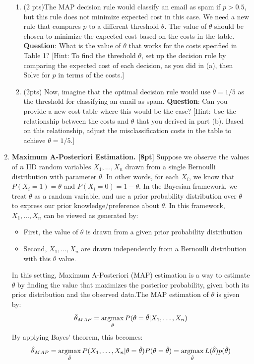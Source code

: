 \documentclass{article}
\def\argmax{\mathop{\rm argmax}}
\begin{document}
\begin{enumerate}
\begin{enumerate}
\item (2 pts)The MAP decision rule would classify an email as spam if $p>0.5$, but this rule does not minimize expected cost in this case. We need a new rule that compares $p$ to a different threshold $\theta$. The value of $\theta$ should be chosen to minimize the expected cost based on the costs in the table.\\
\textbf{Question}: What is the value of $\theta$ that works for the costs specified in Table 1? [Hint: To find the threshold $\theta$, set up the decision rule by comparing the expected cost of each decision, as you did in (a), then Solve for $p$ in terms of the costs.]\\

\item (2pts) Now, imagine that the optimal decision rule would use $\theta=1/5$ as the threshold for classifying an email as spam. \textbf{Question}: Can you provide a new cost table where this would be the case? [Hint: Use the relationship between the costs and $\theta$ that you derived in part (b). Based on this relationship, adjust the misclassification costs in the table to achieve $\theta = 1/5$.]

\end{enumerate}

\item \textbf{Maximum A-Posteriori Estimation. [8pt]}
Suppose we observe the values of $n$ IID random variables $X_1, \dots , X_n$ drawn from a single Bernoulli
distribution with parameter $\theta$. In other words, for each $X_i$, we know that $P(X_i = 1) =\theta$ and $P(X_i = 0) = 1- \theta$.
In the Bayesian framework, we treat $\theta$ as a random variable, and use a prior probability distribution over $\theta$ to express our prior knowledge/preference about $\theta$. In this framework,  $X_1, \dots, X_n$ can be viewed as generated by:
\begin{itemize}
\item First, the value of $\theta$ is drawn from a given prior probability distribution
\item Second, $X_1, \dots, X_n$ are drawn independently from a Bernoulli distribution with this $\theta$ value.
\end{itemize}
In this setting, Maximum A-Posteriori (MAP) estimation  is a way to estimate $\theta$ by finding the value that maximizes the posterior probability, given both its prior distribution and the observed data.The MAP estimation of $\theta$ is given by:
\[
\hat{\theta}_{MAP} = \argmax_{\hat{\theta}}P(\theta=\hat{\theta}|X_1,\dots, X_n)\]
By applying Bayes' theorem, this becomes:
\[\hat{\theta}_{MAP}=\argmax_{\hat{\theta}}P(X_1,\dots,X_n|\theta = \hat{\theta} )P(\theta=\hat{\theta}) = \argmax_{\hat{\theta}}L(\hat{\theta})p(\hat{\theta})\]


\end{enumerate}
\end{document}
